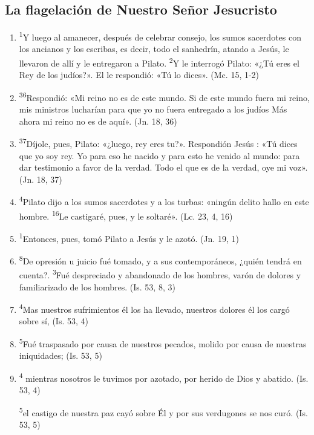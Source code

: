 \documentclass[a4paper,11pt]{article}
\begin{document}
    \subsection*{\hfil La flagelación de Nuestro Señor Jesucristo \hfil}
      
      \begin{enumerate}
        
        \item \textsuperscript{1}Y luego al amanecer, después de celebrar consejo, los sumos sacerdotes con los ancianos y los escribas, es decir, todo el sanhedrín, atando a Jesús,
        le llevaron de allí y le entregaron a Pilato. \textsuperscript{2}Y le interrogó Pilato: «¿Tú eres el Rey de los judíos?». El le respondió: «Tú lo dices». (Mc. 15, 1-2)

        \item \textsuperscript{36}Respondió: «Mi reino no es de este mundo. Si de este mundo fuera mi reino, mis ministros lucharían para que yo no fuera entregado a los judíos
        Más ahora mi reino no es de aquí». (Jn. 18, 36)

        \item \textsuperscript{37}Díjole, pues, Pilato: «¿luego, rey eres tu?». Respondión Jesús : «Tú dices que yo soy rey. Yo para eso he nacido y para esto he venido
        al mundo: para dar testimonio a favor de la verdad. Todo el que es de la verdad, oye mi voz». (Jn. 18, 37)

        \item \textsuperscript{4}Pilato dijo a los sumos sacerdotes y a los turbas: «ningún delito hallo en este hombre. 
        \textsuperscript{16}Le castigaré, pues, y le soltaré». (Lc. 23, 4, 16)

        \item \textsuperscript{1}Entonces, pues, tomó Pilato a Jesús y le azotó. (Jn. 19, 1)

        \item \textsuperscript{8}De opresión u juicio fué tomado, y a sus contemporáneos, ¿quién tendrá en cuenta?. \textsuperscript{3}Fué despreciado y abandonado de los hombres,
        varón de dolores y familiarizado de los hombres. (Is. 53, 8, 3)

        \item \textsuperscript{4}Mas nuestros sufrimientos él los ha llevado, nuestros dolores él los cargó sobre sí, (Is. 53, 4)

        \item \textsuperscript{5}Fué traspasado por causa de nuestros pecados, molido por causa de nuestras iniquidades; (Is. 53, 5)

        \item \textsuperscript{4} mientras nosotros le tuvimos por azotado, por herido de Dios y abatido. (Is. 53, 4)

        \textsuperscript{5}el castigo de nuestra paz cayó sobre Él y por sus verdugones se nos curó. (Is. 53, 5)

      \end{enumerate}
      
\end{document}
